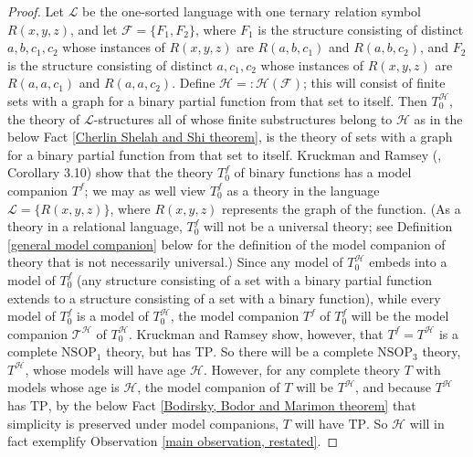 \documentclass{amsart}
\theoremstyle{definition}
\theoremstyle{remark}
\numberwithin{equation}{section}
\begin{document}
\begin{proof}
    Let $\mathcal{L}$ be the one-sorted language with one ternary relation symbol $R(x, y, z)$, and let $\mathcal{F}= \{F_1, F_2\}$, where $F_{1}$ is the structure consisting of distinct $a, b, c_1, c_{2}$ whose instances of $R(x, y, z)$ are $R(a, b, c_1)$ and $R(a, b, c_2)$, and $F_{2}$ is the structure consisting of distinct $a, c_1, c_2$ whose instances of $R(x, y, z)$ are $R(a, a, c_1)$ and $R(a, a, c_2)$. Define $\mathcal{H}=:\mathcal{H}(\mathcal{F})$; this will consist of finite sets with a graph for a binary partial function from that set to itself. Then $T^{\mathcal{H}}_{0}$, the theory of $\mathcal{L}$-structures all of whose finite substructures belong to $\mathcal{H}$ as in the below Fact \ref{Cherlin Shelah and Shi theorem}, is the theory of sets with a graph for a binary partial function from that set to itself. Kruckman and Ramsey (\cite{KR17}, Corollary 3.10) show that the theory $T^{f}_{0}$ of binary functions has a model companion $T^{f}$; we may as well view $T^{f}_{0}$ as a theory in the language $\mathcal{L} = \{ R(x, y, z) \}$, where $R(x, y, z)$ represents the graph of the function. (As a theory in a relational language, $T^{f}_{0}$ will not be a universal theory; see Definition \ref{general model companion} below for the definition of the model companion of theory that is not necessarily universal.)  Since any model of $T^{\mathcal{H}}_{0}$ embeds into a model of $T^{f}_{0}$ (any structure consisting of a set with a binary partial function extends to a structure consisting of a set with a binary function), while every model of $T_{0}^{f}$ is a model of $T^{\mathcal{H}}_{0}$, the model companion $T^{f}$ of $T_{0}^{f}$ will be the model companion $\mathcal{T}^{\mathcal{H}}$ of $T^{\mathcal{H}}_{0}$. Kruckman and Ramsey show, however, that $T^{f} = T^{\mathcal{H}}$ is a complete $\mathrm{NSOP}_{1}$ theory, but has $\mathrm{TP}$. So there will be a complete $\mathrm{NSOP}_{3}$ theory, $T^{\mathcal{H}}$, whose models will have age $\mathcal{H}$. However, for any complete theory $T$ with models whose age is $\mathcal{H}$, the model companion of $T$ will be $T^{\mathcal{H}}$, and because $T^{\mathcal{H}}$ has $\mathrm{TP}$, by the below Fact \ref{Bodirsky, Bodor and Marimon theorem} that simplicity is preserved under model companions, $T$ will have $\mathrm{TP}$. So $\mathcal{H}$ will in fact exemplify Observation \ref{main observation, restated}.
\end{proof}
\end{document}

